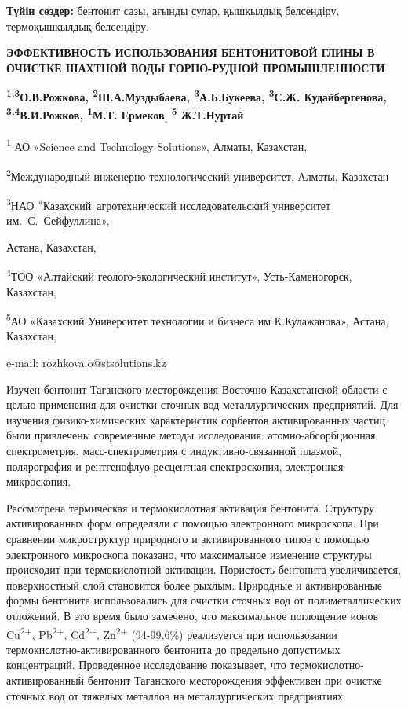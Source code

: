 {\bfseries Түйін сөздер:} бентонит сазы, ағынды сулар, қышқылдық
белсендіру, термоқышқылдық белсендіру.

\begin{center}
{\large\bfseries ЭФФЕКТИВНОСТЬ ИСПОЛЬЗОВАНИЯ БЕНТОНИТОВОЙ ГЛИНЫ В ОЧИСТКЕ ШАХТНОЙ
ВОДЫ ГОРНО-РУДНОЙ ПРОМЫШЛЕННОСТИ}

{\bfseries \textsuperscript{1,3}О.В.Рожкова\envelope, \textsuperscript{2}Ш.А.Муздыбаева, \textsuperscript{3}А.Б.Букеева, \textsuperscript{3}С.Ж. Кудайбергенова, \textsuperscript{3,4}В.И.Рожков, \textsuperscript{1}М.Т. Ермеков\textsubscript{,} \textsuperscript{5} Ж.Т.Нуртай}

\textsuperscript{1} АО «Science and Technology Solutions», Алматы,
Казахстан,

\textsuperscript{2}Международный инженерно-технологический университет,
Алматы, Казахстан

\textsuperscript{3}НАО \textsuperscript{«}Казахский~агротехнический
исследовательский университет им.~С.~Сейфуллина»,

Астана, Казахстан,

\textsuperscript{4}ТОО «Алтайский геолого-экологический институт»,
Усть-Каменогорск, Казахстан,

\textsuperscript{5}АО «Казахский Университет технологии и бизнеса им
К.Кулажанова», Астана, Казахстан,

e-mail: rozhkova.o@stsolutions.kz
\end{center}

Изучен бентонит Таганского месторождения Восточно-Казахстанской области
с целью применения для очистки сточных вод металлургических предприятий.
Для изучения физико-химических характеристик сорбентов активированных
частиц были привлечены современные методы исследования:
атомно-абсорбционная спектрометрия, масс-спектрометрия с
индуктивно-связанной плазмой, полярография и рентгенофлуо-ресцентная
спектроскопия, электронная микроскопия.

Рассмотрена термическая и термокислотная активация бентонита. Структуру
активированных форм определяли с помощью электронного микроскопа. При
сравнении микроструктур природного и активированного типов с помощью
электронного микроскопа показано, что максимальное изменение структуры
происходит при термокислотной активации. Пористость бентонита
увеличивается, поверхностный слой становится более рыхлым. Природные и
активированные формы бентонита использовались для очистки сточных вод от
полиметаллических отложений. В это время было замечено, что максимальное
поглощение ионов Cu\textsuperscript{2+}, Pb\textsuperscript{2+},
Cd\textsuperscript{2+}, Zn\textsuperscript{2+} (94-99,6\%) реализуется
при использовании термокислотно-активированного бентонита до предельно
допустимых концентраций. Проведенное исследование показывает, что
термокислотно-активированный бентонит Таганского месторождения
эффективен при очистке сточных вод от тяжелых металлов на
металлургических предприятиях.

